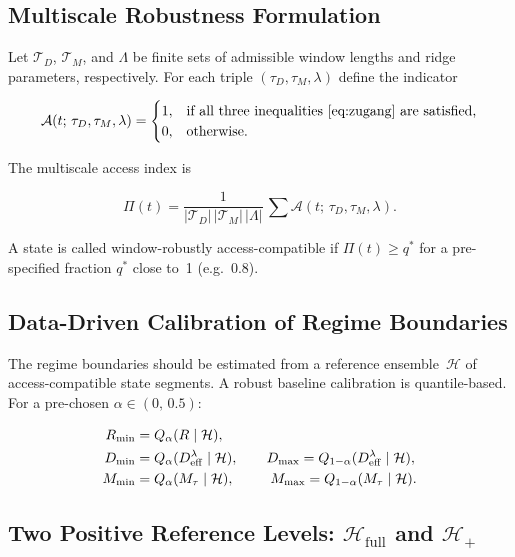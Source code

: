 \documentclass[11pt,a4paper]{article}
\theoremstyle{plain}
\theoremstyle{definition}
\theoremstyle{remark}
\newcommand{\Deff}{D_{\mathrm{eff}}}
\newcommand{\Mtau}{M_{\tau}}
\newcommand{\Rmin}{R_{\min}}
\newcommand{\Dmin}{D_{\min}}
\newcommand{\Dmax}{D_{\max}}
\newcommand{\Mmin}{M_{\min}}
\newcommand{\Mmax}{M_{\max}}
\begin{document}
\subsection{Multiscale Robustness Formulation}

Let $\mathcal{T}_D$, $\mathcal{T}_M$, and $\Lambda$ be finite sets of admissible window lengths and ridge parameters, respectively. For each triple $(\tau_D, \tau_M, \lambda)$ define the indicator

\begin{equation}
\mathcal{A}(t;\,\tau_D,\tau_M,\lambda) =
\begin{cases}
1, & \text{if all three inequalities~\eqref{eq:zugang} are satisfied,}\\
0, & \text{otherwise.}
\end{cases}
\end{equation}

The multiscale access index is

\begin{equation}
\label{eq:Pi}
\Pi(t) = \frac{1}{|\mathcal{T}_D|\,|\mathcal{T}_M|\,|\Lambda|}\,\sum \mathcal{A}(t;\,\tau_D,\tau_M,\lambda).
\end{equation}

A state is called window-robustly access-compatible if $\Pi(t) \geq q^*$ for a pre-specified fraction $q^*$ close to~1 (e.g.\ 0.8).

\subsection{Data-Driven Calibration of Regime Boundaries}

The regime boundaries should be estimated from a reference ensemble~$\mathcal{H}$ of access-compatible state segments. A robust baseline calibration is quantile-based. For a pre-chosen $\alpha \in (0,\,0.5)$:

\begin{align}
\Rmin &= Q_{\alpha}(R \mid \mathcal{H}), \notag\\
\Dmin &= Q_{\alpha}(\Deff^{\lambda} \mid \mathcal{H}), \qquad
\Dmax = Q_{1-\alpha}(\Deff^{\lambda} \mid \mathcal{H}), \label{eq:kalib}\\
\Mmin &= Q_{\alpha}(\Mtau \mid \mathcal{H}), \qquad\;\;
\Mmax = Q_{1-\alpha}(\Mtau \mid \mathcal{H}). \notag
\end{align}

\subsection{Two Positive Reference Levels: $\mathcal{H}_{\mathrm{full}}$ and $\mathcal{H}_{+}$}
\end{document}
